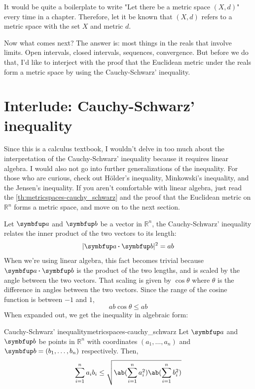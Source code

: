 It would be quite a boilerplate to write "Let there be a metric space \((X, d)\)" every
time in a chapter. Therefore, let it be known that \((X, d)\) refers to a metric space
with the set \(X\) and metric \(d\).

Now what comes next? The answer is: most things in the reals that involve limits. Open intervals,
closed intervals, sequences, convergence. But before we do that, I'd like to interject
with the proof that the Euclidean metric under the reals form a metric space by
using the Cauchy-Schwarz' inequality.

\section{Interlude: Cauchy-Schwarz' inequality}
\label{sec:metricspaces-cauchy_schwarz}

Since this is a calculus textbook, I wouldn't delve in too much about the interpretation
of the Cauchy-Schwarz' inequality because it requires linear algebra. I would also not
go into further generalizations of the inequality. For those who are curious, check out
H\"older's inequality, Minkowski's inequality, and the Jensen's inequality. If you aren't
comfortable with linear algebra, just read the \cref{th:metricspaces-cauchy_schwarz} and the proof
that the Euclidean metric on \(\mathbb{R}^n\) forms a metric space, and move on to the next section.

Let \(\vv{a}\) and \(\vv{b}\) be a vector in \(\mathbb{R}^n\), the Cauchy-Schwarz'
inequality relates the inner product of the two vectors to its length:
\begin{equation}
  |\vv{a} \vdot \vv{b}|^2 = ab
\end{equation}
When we're using linear algebra, this fact becomes trivial because \(\vv{a} \vdot \vv{b}\)
is the product of the two lengths, and is scaled by the angle between the two vectors.
That scaling is given by \(\cos\theta\) where \(\theta\) is the difference in angles
between the two vectors. Since the range of the cosine function is between \(-1\) and \(1\),
\begin{equation}
  a b \cos\theta \leq a b
\end{equation}
When expanded out, we get the inequality in algebraic form:

\begin{theorem}{Cauchy-Schwarz' inequality}{metricspaces-cauchy_schwarz}
  Let \(\vv{a}\) and \(\vv{b}\) be points in \(\mathbb{R}^n\) with coordinates \((a_1, \dots, a_n)\)
  and \(\vv{b} = (b_1, \dots, b_n)\) respectively. Then, 
  \begin{equation}
    \sum_{i=1}^n a_i b_i \leq \sqrt{\ab(\sum_{i=1}^n a_i^2) \ab(\sum_{i=1}^n b_i^2)}
  \end{equation}
\end{theorem}

